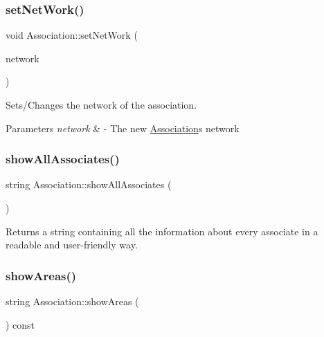 \subsubsection{\texorpdfstring{set\+Net\+Work()}{setNetWork()}}
{\footnotesize\ttfamily void Association\+::set\+Net\+Work (\begin{DoxyParamCaption}\item[{\mbox{\hyperlink{classNetwork}{Network}} $\ast$}]{network }\end{DoxyParamCaption})}



Sets/\+Changes the network of the association. 


\begin{DoxyParams}{Parameters}
{\em network} & -\/ The new \mbox{\hyperlink{classAssociation}{Association}}\textquotesingle{}s network \\
\hline
\end{DoxyParams}
\mbox{\label{classAssociation_a266f2b14cd40429396b93ca29abcbf0c}} 
\subsubsection{\texorpdfstring{show\+All\+Associates()}{showAllAssociates()}}
{\footnotesize\ttfamily string Association\+::show\+All\+Associates (\begin{DoxyParamCaption}{ }\end{DoxyParamCaption})}



Returns a string containing all the information about every associate in a readable and user-\/friendly way. 

\mbox{\label{classAssociation_a149a29d7d7b59d15dadd84a2289c87e4}} 
\subsubsection{\texorpdfstring{show\+Areas()}{showAreas()}}
{\footnotesize\ttfamily string Association\+::show\+Areas (\begin{DoxyParamCaption}{ }\end{DoxyParamCaption}) const}



